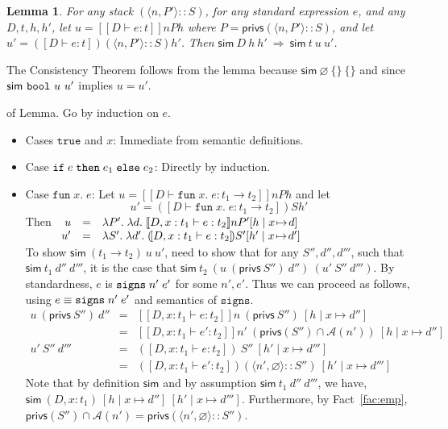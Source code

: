 \documentclass[submission,copyright,creativecommons]{eptcs}
\newcommand{\ifthenelse}[3]{\IF\;#1\;\THEN\;#2\;\ELSE\;#3}
\newcommand{\signs}[2]{\SIGNS\;#1\;#2}
\newcommand{\BOOL}{\mbox{\texttt{bool}}}
\newcommand{\ELSE}{\mbox{\texttt{else}}}
\newcommand{\IF}{\mbox{\texttt{if}}}
\newcommand{\THEN}{{\texttt{then}}}
\newcommand{\TRUE}{{\texttt{true}}}
\newcommand{\A}{\mathcal{A}}
\newcommand{\ldb}{[\![}
\newcommand{\rdb}{]\!]}
\newcommand{\means}[1]{\ldb {#1}\rdb}
\newcommand{\intersect}{\cap}
\newcommand{\proves}{\vdash}
\newcommand{\ext}[3]{[#1\mid#2\!\mapsto\!#3]}
\newcommand{\lam}[2]{\lambda #1.\; #2} \newcommand{\all}[2]{\forall #1.\; #2}
\newcommand{\Empty}{\varnothing}
\newcommand{\tuple}[1]{\langle #1 \rangle}
\newcommand{\SIGNS}{\mbox{\texttt{signs}}}
\newcommand{\privs}{\textsf{privs}}
\newcommand{\Sim}{\textsf{sim}}
\newcommand{\LAM}[2]{{\mathtt{fun}\; #1.\; #2}}
\newcommand{\D}{D} \newcommand{\ty}{t} \renewcommand{\th}{\theta}
\newcommand{\n}{n} \newcommand{\p}{p} \newcommand{\Ps}{\Pi} \newcommand{\h}{h}
\newcommand{\meanss}[1]{(\![ {#1}]\!)}
\renewcommand{\implies}{\mathbin{\:\Rightarrow\:}}
\newtheorem{lemma}[theorem]{Lemma}
\newenvironment{xproof}{\begin{trivlist}\item[\hskip\labelsep{\bf  
Proof:}]}{\end{trivlist}}
\begin{document}
\begin{lemma}
\label{lem:sim}
For any  stack $(\tuple{\n,P'}::S)$, for any 
standard expression $e$, and any $\D,\ty,\h, \h'$,
let $u=\means{\D\proves e:\ty}\n P \h$ where $P=\privs(\tuple{\n,P'}::S)$, 
and let 
\( u'=\meanss{\D\proves e:\ty}(\tuple{\n,P'}::S)\h'\).
Then $\Sim~\D~\h~\h'\implies \Sim~\ty~u~u'$.
\end{lemma}
The Consistency Theorem follows from the lemma because 
$\Sim~\Empty~\{\}~\{\}$ and since $\Sim~\BOOL~u~u'$ implies $u=u'$.
\begin{xproof} of Lemma. Go by induction on $e$.  
\begin{itemize}
\item Cases $\TRUE$ and $x$:
Immediate from semantic definitions.
\item Case $\ifthenelse{e}{e_1}{e_2}$:
Directly by induction.
\item Case $\LAM{x}{e}$:
Let $u=\means{\D\proves\LAM{x}{e}:\ty_1\to\ty_2}\n P \h$ and
let \[ u'=\meanss{\D\proves\LAM{x}{e}:\ty_1\to\ty_2}S \h' \] Then 
\(\begin{array}[t]{rcl}
u &=&
\lam{P'}
    {\lam{d}
    {\means{\D,x:\ty_{1}\proves e:\ty_{2}}\n P'\ext{\h}{x}{d}}}\\
u'&=&
\lam{S'}
    {\lam{d'}
         {\meanss{\D,x:\ty_{1}\proves e:\ty_{2}}S' \ext{\h'}{x}{d'}}}
\end{array}
\)\\
To show $\Sim~(\ty_1\to\ty_2)~u~u'$, need to show that for any $S'',
d'', d'''$, such that $\Sim~\ty_1~d''~d'''$, it is
the case that $\Sim~\ty_2~(u~(\privs~S'')~d'')~(u'~S''~d''')$.  By
standardness, $e$ is $\signs{\n'}{e'}$ for some $\n',e'$.  Thus we can
proceed as follows, using $e \equiv \signs{\n'}{e'}$ and semantics of
$\mathtt{signs}$.
\begin{eqnarray*}
u~(\privs~S'')~d''
&=&
\means{\D,x:\ty_1\proves e:\ty_2}\n~(\privs~S'')~\ext{\h}{x}{d''}\\
&=& 
\means{\D,x:\ty_1\proves e':\ty_2}\n'~(\privs(S'')\intersect\A(\n'))~\ext{\h}{x}{d''}\\[2mm]
u'~S''~d'''
&=&
\meanss{\D,x:\ty_1\proves e:\ty_2}~S''~\ext{\h'}{x}{d'''}\\
&=& 
\meanss{\D,x:\ty_1\proves e':\ty_2}(\tuple{\n',\Empty}::S'')~\ext{\h'}{x}{d'''}
\end{eqnarray*}
Note that by definition $\Sim$ and by assumption $\Sim~\ty_1~d''~d'''$,
we have, $\Sim~(\D,x:\ty_1)~\ext{h}{x}{d''}~\ext{h'}{x}{d'''}$. Furthermore,
by Fact~\ref{fac:emp}, 
$\privs(S'')\intersect\A(\n')=\privs(\tuple{\n',\Empty}::S'')$. 

\end{itemize}
\end{xproof}
\end{document}
